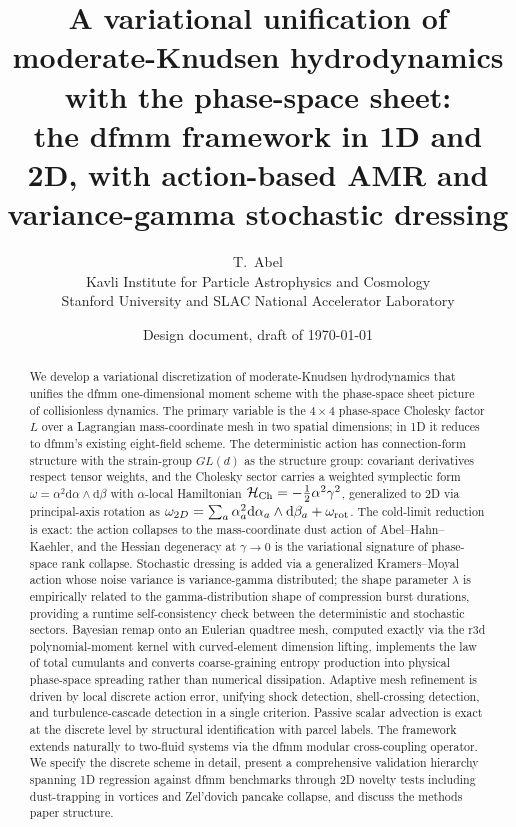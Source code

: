 \documentclass[11pt]{article}
\title{A variational unification of moderate-Knudsen hydrodynamics with
  the phase-space sheet:\\
  the dfmm framework in 1D and 2D, with action-based AMR and
  variance-gamma stochastic dressing}
\author{T.~Abel\\Kavli Institute for Particle Astrophysics and Cosmology\\
  Stanford University and SLAC National Accelerator Laboratory}
\date{Design document, draft of \today}
\newcommand{\dd}{\mathrm{d}}
\newcommand{\half}{\tfrac{1}{2}}
\begin{document}
\maketitle

\begin{abstract}
We develop a variational discretization of moderate-Knudsen
hydrodynamics that unifies the dfmm one-dimensional moment scheme with
the phase-space sheet picture of collisionless dynamics. The primary
variable is the $4\times 4$ phase-space Cholesky factor $L$ over a
Lagrangian mass-coordinate mesh in two spatial dimensions; in 1D it
reduces to dfmm's existing eight-field scheme. The deterministic
action has connection-form structure with the strain-group $GL(d)$ as
the structure group: covariant derivatives respect tensor weights, and
the Cholesky sector carries a weighted symplectic form $\omega = \alpha^2
\dd\alpha\wedge\dd\beta$ with $\alpha$-local Hamiltonian
$\mathcal{H}_{\rm Ch} = -\half\alpha^2\gamma^2$, generalized to 2D via
principal-axis rotation as $\omega_{2D} = \sum_a \alpha_a^2 \dd\alpha_a
\wedge \dd\beta_a + \omega_{\rm rot}$. The cold-limit reduction is
exact: the action collapses to the mass-coordinate dust action of
Abel--Hahn--Kaehler, and the Hessian degeneracy at $\gamma\to 0$ is
the variational signature of phase-space rank collapse. Stochastic
dressing is added via a generalized Kramers--Moyal action whose
noise variance is variance-gamma distributed; the shape parameter
$\lambda$ is empirically related to the gamma-distribution shape of
compression burst durations, providing a runtime self-consistency
check between the deterministic and stochastic sectors. Bayesian
remap onto an Eulerian quadtree mesh, computed exactly via the r3d
polynomial-moment kernel with curved-element dimension lifting,
implements the law of total cumulants and converts coarse-graining
entropy production into physical phase-space spreading rather than
numerical dissipation. Adaptive mesh refinement is driven by local
discrete action error, unifying shock detection, shell-crossing
detection, and turbulence-cascade detection in a single criterion.
Passive scalar advection is exact at the discrete level by structural
identification with parcel labels. The framework extends naturally to
two-fluid systems via the dfmm modular cross-coupling operator. We
specify the discrete scheme in detail, present a comprehensive
validation hierarchy spanning 1D regression against dfmm benchmarks
through 2D novelty tests including dust-trapping in vortices and
Zel'dovich pancake collapse, and discuss the methods paper structure.
\end{abstract}
\end{document}
